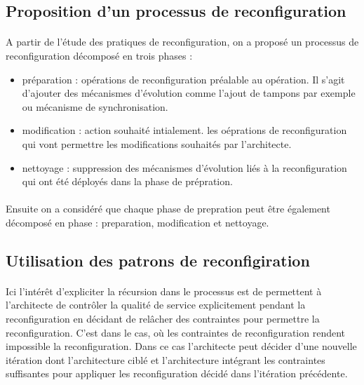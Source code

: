 \subsection{Proposition d'un processus de reconfiguration}

\paragraph{}
A partir de l'étude des pratiques de reconfiguration, on a proposé un
processus de reconfiguration décomposé en trois phases : 
\begin{itemize}
\item préparation : opérations de reconfiguration préalable au
opération. Il s'agit d'ajouter des mécanismes d'évolution comme
l'ajout de tampons par exemple ou mécanisme de synchronisation. 
\item modification : action souhaité intialement. les oéprations de
reconfiguration qui vont permettre les modifications souhaités par
l'architecte. 
\item nettoyage : suppression des mécanismes d'évolution liés à la
reconfiguration qui ont été déployés dans la phase de prépration.  
\end{itemize}

\paragraph{}
Ensuite on a considéré que chaque phase de prepration peut être également
décomposé en phase : preparation, modification et nettoyage. 


\subsection{Utilisation des patrons de reconfigiration}

\paragraph{}
Ici l'intérêt d'expliciter la récursion dans le processus est de
permettent à l'architecte de contrôler la qualité de service
explicitement pendant la reconfiguration en décidant de relâcher des
contraintes pour permettre la reconfiguration. 
%
C'est dans le cas, où les contraintes de reconfiguration rendent
impossible la reconfiguration. Dans ce cas l'architecte peut décider
d'une nouvelle itération dont l'architecture ciblé et l'architecture
intégrant les contraintes suffisantes pour appliquer les
reconfiguration décidé dans l'itération précédente. 

